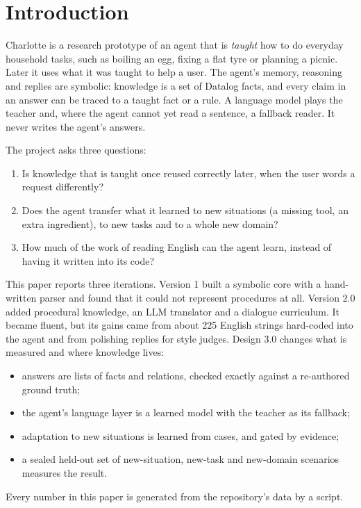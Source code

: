 \section{Introduction}

Charlotte is a research prototype of an agent that is \emph{taught} how to do everyday household tasks, such as boiling an egg, fixing a flat tyre or planning a picnic. Later it uses what it was taught to help a user. The agent's memory, reasoning and replies are symbolic: knowledge is a set of Datalog facts, and every claim in an answer can be traced to a taught fact or a rule. A language model plays the teacher and, where the agent cannot yet read a sentence, a fallback reader. It never writes the agent's answers.

The project asks three questions:
\begin{enumerate}
  \item Is knowledge that is taught once reused correctly later, when the user words a request differently?
  \item Does the agent transfer what it learned to new situations (a missing tool, an extra ingredient), to new tasks and to a whole new domain?
  \item How much of the work of reading English can the agent learn, instead of having it written into its code?
\end{enumerate}

This paper reports three iterations. Version 1 built a symbolic core with a hand-written parser and found that it could not represent procedures at all. Version 2.0 added procedural knowledge, an LLM translator and a dialogue curriculum. It became fluent, but its gains came from about 225 English strings hard-coded into the agent and from polishing replies for style judges. Design 3.0 changes what is measured and where knowledge lives:
\begin{itemize}
  \item answers are lists of facts and relations, checked exactly against a re-authored ground truth;
  \item the agent's language layer is a learned model with the teacher as its fallback;
  \item adaptation to new situations is learned from cases, and gated by evidence;
  \item a sealed held-out set of \hThreeS{} new-situation, \hThreeT{} new-task and \hThreeG{} new-domain scenarios measures the result.
\end{itemize}
Every number in this paper is generated from the repository's data by a script.
